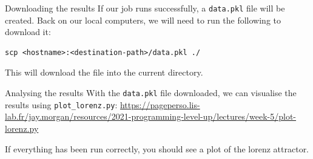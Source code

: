 \documentclass[10pt]{beamer}
\begin{document}
\begin{frame}[label={sec:org9cde405},fragile]{Downloading the results}
 If our job runs successfully, a \texttt{data.pkl} file will be created. Back on our local
computers, we will need to run the following to download it:

\begin{verbatim}
scp <hostname>:<destination-path>/data.pkl ./
\end{verbatim}

This will download the file into the current directory.
\end{frame}

\begin{frame}[label={sec:org5079e08},fragile]{Analysing the results}
 With the \texttt{data.pkl} file downloaded, we can visualise the results using
\texttt{plot\_lorenz.py}:
\url{https://pageperso.lis-lab.fr/jay.morgan/resources/2021-programming-level-up/lectures/week-5/plot-lorenz.py}

If everything has been run correctly, you should see a plot of the lorenz attractor.
\end{frame}
\end{document}

